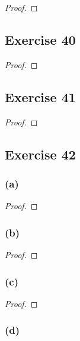\documentclass[14pt]{extarticle}
\begin{document}
\begin{proof}

\end{proof}

\subsection{Exercise 40}

\begin{proof}

\end{proof}

\subsection{Exercise 41}

\begin{proof}

\end{proof}

\subsection{Exercise 42}

\subsubsection{(a)}

\begin{proof}

\end{proof}

\subsubsection{(b)}

\begin{proof}

\end{proof}

\subsubsection{(c)}

\begin{proof}

\end{proof}

\subsubsection{(d)}
\end{document}

